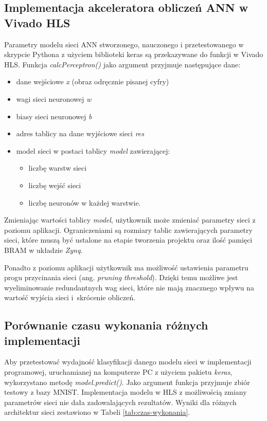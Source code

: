 \subsection{Implementacja akceleratora obliczeń ANN w Vivado HLS}
  Parametry modelu sieci ANN stworzonego, nauczonego i przetestowanego w skrypcie Pythona z użyciem biblioteki keras są przekazywane do funkcji w Vivado HLS. Funkcja \emph{calcPerceptron()} jako argument przyjmuje następujące dane:
  \begin{itemize}
    \item dane wejściowe \emph{x} (obraz odręcznie pisanej cyfry)
    \item wagi sieci neuronowej \emph{w}
    \item biasy sieci neuronowej \emph{b}
    \item adres tablicy na dane wyjściowe sieci \emph{res}
    \item model sieci w postaci tablicy \emph{model} zawierającej:
    \begin{itemize}
      \item liczbę warstw sieci
      \item liczbę wejść sieci
      \item liczbę neuronów w każdej warstwie.
    \end{itemize}
  \end{itemize}

Zmieniając wartości tablicy \emph{model}, użytkownik może zmieniać parametry sieci z poziomu 
aplikacji. Ograniczeniami są rozmiary tablic zawierających parametry sieci, które muszą być 
ustalone na etapie tworzenia projektu oraz ilość pamięci BRAM w układzie \emph{Zynq}.
   
Ponadto z poziomu aplikacji użytkownik ma możliwość ustawienia parametru progu przycinania sieci 
(ang. \emph{pruning threshold}). Dzięki temu możliwe jest wyeliminowanie redundantnych wag sieci, które nie mają znacznego wpływu na wartość wyjścia sieci i~skrócenie obliczeń.


\subsection{Porównanie czasu wykonania różnych implementacji}

Aby przetestować wydajność klasyfikacji danego modelu sieci w implementacji programowej, uruchamianej na komputerze PC z użyciem pakietu \emph{keras}, wykorzystano metodę \emph{model.predict()}. Jako argument funkcja przyjmuje zbiór testowy z bazy MNIST.
Implementacja modelu w HLS z możliwością zmiany parametrów sieci nie dała zadowalających rezultatów. Wyniki dla różnych architektur sieci zestawiono w Tabeli \ref{tab:czas-wykonania}. 

